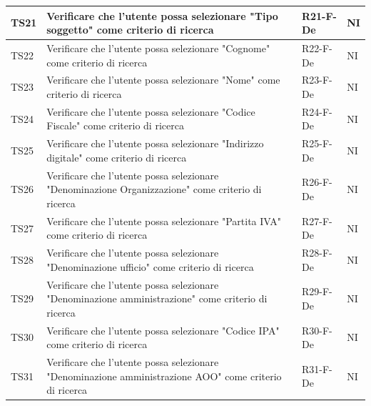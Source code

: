 \documentclass[a4paper,12pt]{article}
\begin{document}
\begin{longtable}{|M{1.2cm}|M{6.3cm}|M{2.5cm}|M{1.5cm}|}
                TS21 & Verificare che l'utente possa selezionare "Tipo soggetto" come criterio di ricerca & R21-F-De & NI \\
                \hline
                
                TS22 & Verificare che l'utente possa selezionare "Cognome" come criterio di ricerca & R22-F-De & NI \\
                \hline
                
                TS23 & Verificare che l'utente possa selezionare "Nome" come criterio di ricerca & R23-F-De & NI \\
                \hline
                
                TS24 & Verificare che l'utente possa selezionare "Codice Fiscale" come criterio di ricerca & R24-F-De & NI \\
                \hline
                
                TS25 & Verificare che l'utente possa selezionare "Indirizzo digitale" come criterio di ricerca & R25-F-De & NI \\
                \hline
                
                TS26 & Verificare che l'utente possa selezionare "Denominazione Organizzazione" come criterio di ricerca & R26-F-De & NI \\
                \hline
                
                TS27 & Verificare che l'utente possa selezionare "Partita IVA" come criterio di ricerca & R27-F-De & NI \\
                \hline

                TS28 & Verificare che l'utente possa selezionare "Denominazione ufficio" come criterio di ricerca & R28-F-De & NI \\
                \hline
                
                TS29 & Verificare che l'utente possa selezionare "Denominazione amministrazione" come criterio di ricerca & R29-F-De & NI \\
                \hline

                TS30 & Verificare che l'utente possa selezionare "Codice IPA" come criterio di ricerca & R30-F-De & NI \\
                \hline

                TS31 & Verificare che l'utente possa selezionare "Denominazione amministrazione AOO" come criterio di ricerca & R31-F-De & NI \\
                \hline


\end{longtable}
\end{document}
